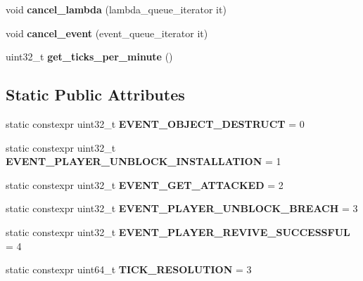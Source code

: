 \begin{DoxyCompactItemize}
\mbox{\label{classmods_1_1deferred_acbd4699c918bcaaa129e46a26c43da16}} 
void {\bfseries cancel\+\_\+lambda} (lambda\+\_\+queue\+\_\+iterator it)
\item 
\mbox{\label{classmods_1_1deferred_a1ccc63aa64057b4e5e1819816417f041}} 
void {\bfseries cancel\+\_\+event} (event\+\_\+queue\+\_\+iterator it)
\item 
\mbox{\label{classmods_1_1deferred_a80b0c114610dfcfb48292f95a7ffda8e}} 
uint32\+\_\+t {\bfseries get\+\_\+ticks\+\_\+per\+\_\+minute} ()
\end{DoxyCompactItemize}
\subsection*{Static Public Attributes}
\begin{DoxyCompactItemize}
\item 
\mbox{\label{classmods_1_1deferred_af4e84e4394187efdeb48f6a27b811aed}} 
static constexpr uint32\+\_\+t {\bfseries E\+V\+E\+N\+T\+\_\+\+O\+B\+J\+E\+C\+T\+\_\+\+D\+E\+S\+T\+R\+U\+CT} = 0
\item 
\mbox{\label{classmods_1_1deferred_a875a87df39bf4ed34f281a59e0c7a18f}} 
static constexpr uint32\+\_\+t {\bfseries E\+V\+E\+N\+T\+\_\+\+P\+L\+A\+Y\+E\+R\+\_\+\+U\+N\+B\+L\+O\+C\+K\+\_\+\+I\+N\+S\+T\+A\+L\+L\+A\+T\+I\+ON} = 1
\item 
\mbox{\label{classmods_1_1deferred_ab5c5f5b79e4690006471a0253f9fb2db}} 
static constexpr uint32\+\_\+t {\bfseries E\+V\+E\+N\+T\+\_\+\+G\+E\+T\+\_\+\+A\+T\+T\+A\+C\+K\+ED} = 2
\item 
\mbox{\label{classmods_1_1deferred_a7e8c5a393917f9234e2fbdc8a79c9a31}} 
static constexpr uint32\+\_\+t {\bfseries E\+V\+E\+N\+T\+\_\+\+P\+L\+A\+Y\+E\+R\+\_\+\+U\+N\+B\+L\+O\+C\+K\+\_\+\+B\+R\+E\+A\+CH} = 3
\item 
\mbox{\label{classmods_1_1deferred_aa1e90616fe03e6b5f5405f04beb534d0}} 
static constexpr uint32\+\_\+t {\bfseries E\+V\+E\+N\+T\+\_\+\+P\+L\+A\+Y\+E\+R\+\_\+\+R\+E\+V\+I\+V\+E\+\_\+\+S\+U\+C\+C\+E\+S\+S\+F\+UL} = 4
\item 
\mbox{\label{classmods_1_1deferred_a5f85f1db9acec899e3fc93e0c10aa050}} 
static constexpr uint64\+\_\+t {\bfseries T\+I\+C\+K\+\_\+\+R\+E\+S\+O\+L\+U\+T\+I\+ON} = 3
\end{DoxyCompactItemize}
